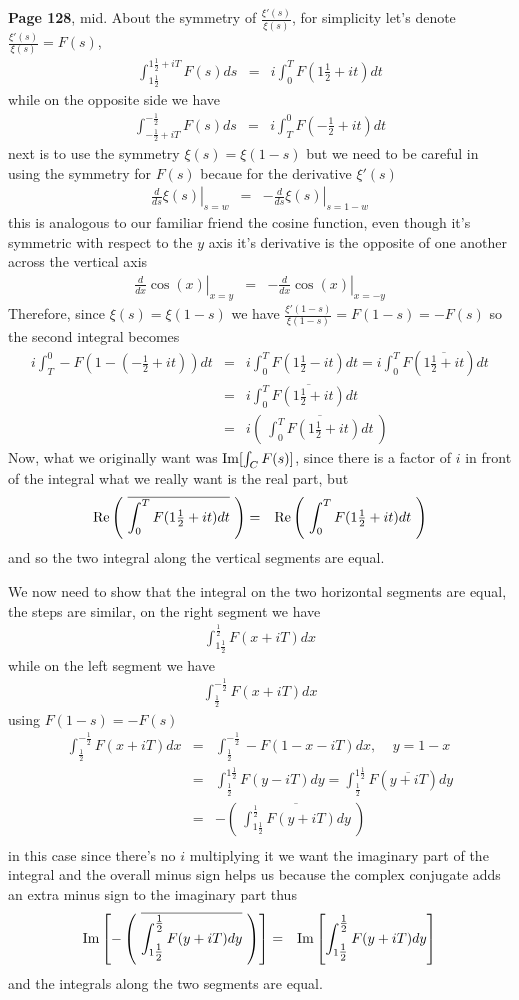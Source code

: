 \documentclass[aps,preprint,preprintnumbers,nofootinbib,showpacs,prd]{revtex4-1}
\newcommand{\nbea}{\begin{eqnarray*}}
\newcommand{\neea}{\end{eqnarray*}}
\def\Im{{\rm Im}}
\newcommand{\re}{{\rm Re}}
\begin{document}
{\bf Page 128}, mid. About the symmetry of $\frac{\xi'(s)}{\xi(s)}$, for simplicity let's denote $\frac{\xi'(s)}{\xi(s)} = F(s)$,
%
\nbea
\int_{1\tfrac{1}{2}}^{1\tfrac{1}{2} + iT} F(s) ds & = & i \int_{0}^{T} F(1\tfrac{1}{2} + it) dt
\neea
%
while on the opposite side we have
%
\nbea
\int_{-\frac{1}{2} + iT}^{-\frac{1}{2}} F(s) ds & = & i \int_{T}^{0} F(-\tfrac{1}{2} + it) dt
\neea
%
next is to use the symmetry $\xi(s) = \xi(1-s)$ but we need to be careful in using the symmetry for $F(s)$ becaue for the derivative $\xi'(s)$
%
\nbea
\left. \frac{d}{ds} \xi(s) \right|_{s = w} & = & -\left. \frac{d}{ds} \xi(s) \right|_{s = 1 - w}
\neea
%
this is analogous to our familiar friend the cosine function, even though it's symmetric with respect to the $y$ axis it's derivative is the opposite of one another across the vertical axis
%
\nbea
\left. \frac{d}{dx}\cos(x) \right|_{x = y} & = & -\left. \frac{d}{dx}\cos(x) \right|_{x = -y}
\neea
%
Therefore, since $\xi(s) = \xi(1-s)$ we have $\frac{\xi'(1-s)}{\xi(1-s)} = F(1-s) = -F(s)$ so the second integral becomes
%
\nbea
i \int_{T}^{0} -F(1 - (-\tfrac{1}{2} + it)) dt & = & i \int_{0}^{T} F(1\tfrac{1}{2} - it) dt = i \int_{0}^{T} F(\overline{1\tfrac{1}{2} + it}) dt \\
& = & i \int_{0}^{T} \overline{F(1\tfrac{1}{2} + it)} dt \\
& = & i \left  ( ~\overline{\int_{0}^{T} F(1\tfrac{1}{2} + it) dt } ~ \right )
\neea
%
Now, what we originally want was $\Im[\int_C F(s)]$, since there is a factor of $i$ in front of the integral what we really want is the real part, but
%
\nbea
\re\left  ( ~\overline{\int_{0}^{T} F(1\tfrac{1}{2} + it) dt } ~ \right ) & = & \re \left  ( ~\int_{0}^{T} F(1\tfrac{1}{2} + it) dt ~ \right )
\neea
%
and so the two integral along the vertical segments are equal.

We now need to show that the integral on the two horizontal segments are equal, the steps are similar, on the right segment we have
%
\nbea
\int_{1\tfrac{1}{2}}^{\tfrac{1}{2}} F(x + iT) dx
\neea
%
while on the left segment we have
%
\nbea
\int_{\tfrac{1}{2}}^{-\tfrac{1}{2}} F(x + iT) dx
\neea
%
using $F(1 - s) = -F(s)$
%
\nbea
\int_{\tfrac{1}{2}}^{-\tfrac{1}{2}} F(x + iT) dx & = & \int_{\tfrac{1}{2}}^{-\tfrac{1}{2}} -F(1-x - iT) dx, ~~~~~ y = 1-x \\
& = & \int_{\tfrac{1}{2}}^{1\tfrac{1}{2}} F(y - iT) dy = \int_{\tfrac{1}{2}}^{1\tfrac{1}{2}} F(\overline{y + iT}) dy \\
& = & -\left ( ~ \overline{\int_{1\tfrac{1}{2}}^{\tfrac{1}{2}} F(y + iT) dy} ~ \right ) \\
\neea
%
in this case since there's no $i$ multiplying it we want the imaginary part of the integral and the overall minus sign helps us because the complex conjugate adds an extra minus sign to the imaginary part thus
%
\nbea
\Im\left \lbrack - \left ( ~ \overline{\int_{1\tfrac{1}{2}}^{\tfrac{1}{2}} F(y + iT) dy} ~ \right ) \right \rbrack & = & \Im \left \lbrack \int_{1\tfrac{1}{2}}^{\tfrac{1}{2}} F(y + iT) dy \right \rbrack
\neea
%
and the integrals along the two segments are equal.
\end{document}
